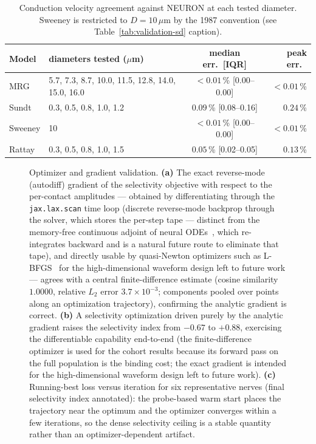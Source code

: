 \begin{table}[h]
  \centering
  \caption{Conduction velocity agreement against NEURON at each tested
    diameter.  Sweeney is restricted to $D=10\,\mu\mathrm{m}$ by the
    1987 convention (see Table~\ref{tab:validation-sd} caption).}
  \label{tab:validation-cv}
  \small
  \begin{tabular}{l p{5.4cm} cr}
    \toprule
    Model    & diameters tested ($\mu$m) & median err.\ [IQR] & peak err.\ \\
    \midrule
    MRG      & 5.7, 7.3, 8.7, 10.0, 11.5, 12.8, 14.0, 15.0, 16.0  & $<0.01$\,\% [0.00--0.00]  & $<0.01$\,\% \\
    Sundt    & 0.3, 0.5, 0.8, 1.0, 1.2                             & $0.09$\,\% [0.08--0.16]   & $0.24$\,\%  \\
    Sweeney  & 10                                                  & $<0.01$\,\% [0.00--0.00]  & $<0.01$\,\% \\
    Rattay   & 0.3, 0.5, 0.8, 1.0, 1.5                             & $0.05$\,\% [0.02--0.05]   & $0.13$\,\%  \\
    \bottomrule
  \end{tabular}
\end{table}

\begin{figure}[h]
  \centering
  \caption{Optimizer and gradient validation.
    \textbf{(a)} The exact reverse-mode (autodiff) gradient of the
    selectivity objective with respect to the per-contact amplitudes ---
    obtained by differentiating through the \texttt{jax.lax.scan} time
    loop (discrete reverse-mode backprop through the solver, which stores
    the per-step tape --- distinct from the memory-free continuous
    adjoint of neural ODEs~\cite{chen2018neuralode}, which re-integrates
    backward and is a natural future route to eliminate that tape), and
    directly usable by
    quasi-Newton optimizers such as L-BFGS~\cite{liu1989lbfgs} for the
    high-dimensional waveform design left to future work ---
    agrees with a central finite-difference estimate (cosine similarity
    $1.0000$, relative $L_2$ error $3.7\times10^{-3}$; components pooled
    over points along an optimization trajectory), confirming the
    analytic gradient is correct.
    \textbf{(b)} A selectivity optimization driven purely by the analytic
    gradient raises the selectivity index from $-0.67$ to $+0.88$,
    exercising the differentiable capability end-to-end (the
    finite-difference optimizer is used for the cohort results because
    its forward pass on the full population is the binding cost; the
    exact gradient is intended for the high-dimensional waveform design
    left to future work).
    \textbf{(c)} Running-best loss versus iteration for six representative
    nerves (final selectivity index annotated): the probe-based warm
    start places the trajectory near the optimum and the optimizer
    converges within a few iterations, so the dense selectivity ceiling
    is a stable quantity rather than an optimizer-dependent artifact.}
  \label{fig:optimizer-validation}
\end{figure}
